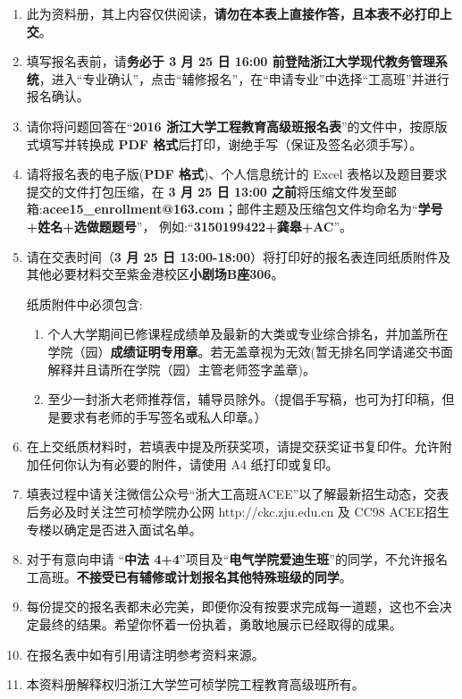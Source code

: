 \documentclass[12pt,a4paper]{article}
\begin{document}
{\fang
\begin{enumerate}[label=\arabic*.]
\setlength{\itemsep}{0.5pt}
\item 此为资料册，其上内容仅供阅读，{\color{red}\bf{请勿在本表上直接作答，且本表不必打印上交}}。 
\item 填写报名表前，请{\color{red}\bf{务必于 3 月 25 日 16:00 前登陆浙江大学现代教务管理系统}}，进入``专业确认''，点击``辅修报名''，在``申请专业''中选择``工高班''并进行报名确认。 
\item 请你将问题回答在``{\color{red}\bf{2016 浙江大学工程教育高级班报名表}}''的文件中，按原版式填写并转换成{\color{red} \bf{PDF 格式}}后打印，谢绝手写（保证及签名必须手写）。
\item 请将报名表的电子版({\color{red}\bf{PDF 格式}})、个人信息统计的 Excel 表格以及题目要求提交的文件打包压缩，在 {\color{red}\bf{3 月 25 日 13:00 之前}}将压缩文件发至邮箱:{\color{red}\bf{acee15\_enrollment@163.com}}；邮件主题及压缩包文件均命名为``{\bf{学号+姓名+选做题题号}}''， 例如:``{\color{red}\bf{3150199422+龚皋+AC}}''。
\item 请在交表时间（{\color{red}\bf{3 月 25 日 13:00-18:00}}）将打印好的报名表连同纸质附件及其他必要材料交至紫金港校区{\color{red}\bf{小剧场B座306}}。\par 
纸质附件中必须包含: 
\begin{enumerate}[label=(\arabic*.)]
\setlength{\itemsep}{0pt}
\item 个人大学期间已修课程成绩单及最新的大类或专业综合排名，并加盖所在学院（园）{\bf{成绩证明专用章}}。若无盖章视为无效(暂无排名同学请递交书面解释并且请所在学院（园）主管老师签字盖章)。
\item 至少一封浙大老师推荐信，辅导员除外。（提倡手写稿，也可为打印稿，但是要求有老师的手写签名或私人印章。）
\end{enumerate}
\item 在上交纸质材料时，若填表中提及所获奖项，请提交获奖证书复印件。允许附加任何你认为有必要的附件，请使用 A4 纸打印或复印。
\item 填表过程中请关注微信公众号``浙大工高班ACEE''以了解最新招生动态，交表后务必及时关注竺可桢学院办公网 http://ckc.zju.edu.cn 及 CC98 ACEE招生专楼以确定是否进入面试名单。
\item 对于有意向申请 ``{\color{red}\bf{中法 4+4}}''项目及``{\color{red}\bf{电气学院爱迪生班}}''的同学，不允许报名工高班。{\color{red}\bf{不接受已有辅修或计划报名其他特殊班级的同学}}。
\item 每份提交的报名表都未必完美，即便你没有按要求完成每一道题，这也不会决定最终的结果。希望你怀着一份执着，勇敢地展示已经取得的成果。
\item 在报名表中如有引用请注明参考资料来源。
\item 本资料册解释权归浙江大学竺可桢学院工程教育高级班所有。
\end{enumerate}
\newpage
{}
}
\end{document}

